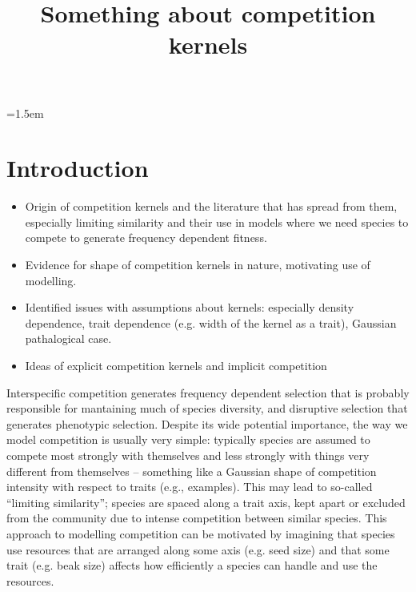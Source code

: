 \documentclass[a4paper,11pt]{article}
\title{Something about competition kernels}
\author{}
\date{}
\affiliation{}
\begin{document}

\mstitlepage
\parindent=1.5em
\addtolength{\parskip}{.3em}


\section{Introduction}

\begin{itemize}
\item Origin of competition kernels and the literature that has spread
  from them, especially limiting similarity and their use in models
  where we need species to compete to generate frequency dependent
  fitness.
\item Evidence for shape of competition kernels in nature, motivating
  use of modelling.
\item Identified issues with assumptions about kernels: especially
  density dependence, trait dependence (e.g. width of the kernel as a
  trait), Gaussian pathalogical case.
\item Ideas of explicit competition kernels and implicit competition
\end{itemize}

Interspecific competition generates frequency dependent selection that
is probably responsible for mantaining much of species diversity, and
disruptive selection that generates phenotypic selection.  Despite its
wide potential importance, the way we model competition is usually
very simple: typically species are assumed to compete most strongly
with themselves and less strongly with things very different from
themselves -- something like a Gaussian shape of competition intensity
with respect to traits (e.g., examples).
This may lead to so-called ``limiting similarity''; species are spaced
along a trait axis, kept apart or excluded from the community due to
intense competition between similar species.
This approach to modelling competition can be motivated by imagining
that species use resources that are arranged along some axis
(e.g. seed size) and that some trait (e.g. beak size) affects how
efficiently a species can handle and use the resources.
\end{document}

